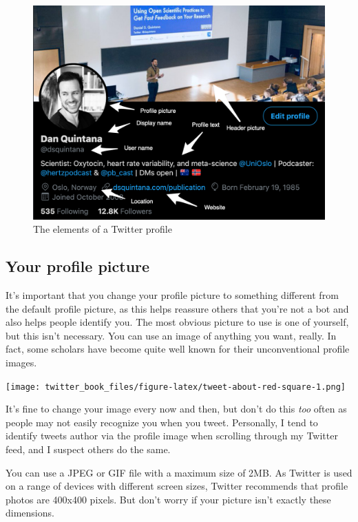\documentclass[
]{book}
\begin{document}
\begin{figure}

\includegraphics[width=0.8\linewidth]{images/profile} \hfill{}

\caption{The elements of a Twitter profile}\label{fig:unnamed-chunk-5}
\end{figure}

\hypertarget{your-profile-picture}{%
\subsection*{Your profile picture}\label{your-profile-picture}}

It's important that you change your profile picture to something different from the default profile picture, as this helps reassure others that you're not a bot and also helps people identify you. The most obvious picture to use is one of yourself, but this isn't necessary. You can use an image of anything you want, really. In fact, some scholars have become quite well known for their unconventional profile images.

\texttt{[image: twitter\_book\_files/figure-latex/tweet-about-red-square-1.png]}

It's fine to change your image every now and then, but don't do this \emph{too} often as people may not easily recognize you when you tweet. Personally, I tend to identify tweets author via the profile image when scrolling through my Twitter feed, and I suspect others do the same.

You can use a JPEG or GIF file with a maximum size of 2MB. As Twitter is used on a range of devices with different screen sizes, Twitter recommends that profile photos are 400x400 pixels. But don't worry if your picture isn't exactly these dimensions.
\end{document}
